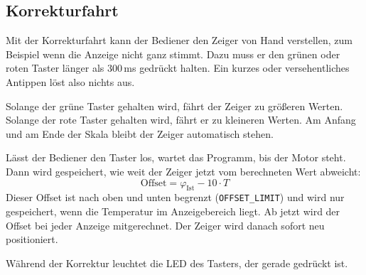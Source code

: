 \subsection{Korrekturfahrt}
\label{sec:korrekturfahrt}
Mit der Korrekturfahrt kann der Bediener den Zeiger von Hand verstellen, zum Beispiel wenn die Anzeige nicht ganz stimmt.
Dazu muss er den grünen oder roten Taster länger als 300\,ms gedrückt halten. Ein kurzes oder versehentliches Antippen löst also nichts aus.

Solange der grüne Taster gehalten wird, fährt der Zeiger zu größeren Werten. Solange der rote Taster gehalten wird, fährt er zu kleineren Werten. 
Am Anfang und am Ende der Skala bleibt der Zeiger automatisch stehen.

Lässt der Bediener den Taster los, wartet das Programm, bis der Motor steht. Dann wird gespeichert, wie weit der Zeiger jetzt vom berechneten Wert abweicht:
\[
\text{Offset} = \varphi_{\mathrm{Ist}} - 10 \cdot T
\]
Dieser Offset ist nach oben und unten begrenzt (\texttt{OFFSET\_LIMIT}) und wird nur gespeichert, wenn die Temperatur im Anzeigebereich liegt. 
Ab jetzt wird der Offset bei jeder Anzeige mitgerechnet. Der Zeiger wird danach sofort neu positioniert.

Während der Korrektur leuchtet die LED des Tasters, der gerade gedrückt ist.




